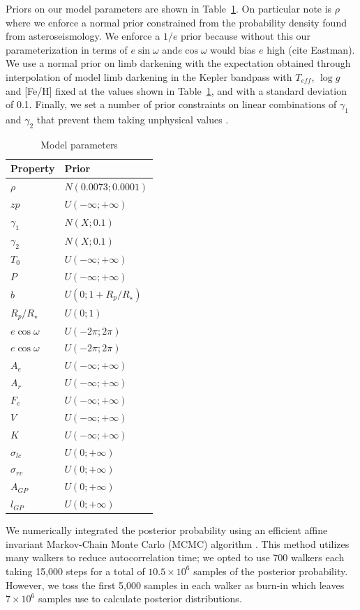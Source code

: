 \documentclass[apjl]{emulateapj}
\begin{document}
Priors on our model parameters are shown in Table~\ref{tab:priors}. On particular note is $\rho$ where we enforce a normal prior constrained from the probability density found from asteroseismology. We enforce a $1/e$ prior because without this our parameterization in terms of $e\sin{\omega}$ and$e\cos{\omega}$ would bias $e$ high (cite Eastman). We use a normal prior on limb darkening with the expectation obtained through interpolation of model limb darkening in the Kepler bandpass with $T_{eff}$, $\log{g}$ and [Fe/H] fixed at the values shown in Table~\ref{tab:priors}, and with a standard deviation of 0.1. Finally, we set a number of prior constraints on linear combinations of $\gamma_1$ and $\gamma_2$ that prevent them taking unphysical values \citep{burke08}.

\begin{table}
\centering
\caption{Model parameters}\label{tab:priors}
\begin{tabular}{l l }
Property & Prior \\
\hline
$\rho$		&	$N(0.0073;0.0001)$ \\
$zp$				& 	$U(-\infty;+\infty)$\\
$\gamma_1$		&	$N(X;0.1)$ \\
$\gamma_2$		&	$N(X;0.1)$\\
$T_0$ & $U(-\infty;+\infty)$\\
$P$ & $U(-\infty;+\infty)$\\
$b$ & $U(0;1+R_{p}/R_{\star})$\\
$R_{p}/R_{\star}$ & $U(0;1)$ \\
$e\cos{\omega}$ &$U(-2\pi;2\pi)$ \\
$e\cos{\omega}$ & $U(-2\pi;2\pi)$\\
$A_e$ &$U(-\infty;+\infty)$ \\
$A_r$ & $U(-\infty;+\infty)$\\
$F_e$ & $U(-\infty;+\infty)$\\
$V$ &$U(-\infty;+\infty)$ \\
$K$ &$U(-\infty;+\infty)$ \\
$\sigma_{lc}$ & $U(0;+\infty)$\\
$\sigma_{rv}$ &$U(0;+\infty)$ \\
$A_{GP}$ &  $U(0;+\infty)$ \\
$l_{GP}$ &  $U(0;+\infty)$ \\
\hline
\end{tabular}
\end{table}

We numerically integrated the posterior probability using an efficient affine invariant Markov-Chain Monte Carlo (MCMC) algorithm \citep{goodman10,foreman12}.  This method utilizes many walkers to reduce autocorrelation time; we opted to use 700 walkers each taking 15,000 steps for a total of $10.5\times10^6$ samples of the posterior probability. However, we toss the first 5,000 samples in each walker as burn-in which leaves $7\times10^6$ samples use to calculate posterior distributions.
\end{document}
